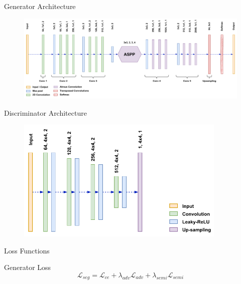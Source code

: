 \begin{frame}{Generator Architecture}
    \begin{figure}[!htb]
        \centering
        \includegraphics[width=14cm]{figures/method/generator_architecture}
    \end{figure}
\end{frame}


\begin{frame}{Discriminator Architecture}
    \begin{figure}[!htb]
        \centering
        \includegraphics[width=10cm]{figures/method/discriminator_architecture}
    \end{figure}
\end{frame}


\begin{frame}{Loss Functions}
    \begin{block}{Generator Loss}
        \begin{equation}
            \label{eq:seg_loss}
            \mathcal{L}_{seg} = \mathcal{L}_{ce} + \lambda_{adv}\mathcal{L}_{adv} + \lambda_{semi}\mathcal{L}_{semi}
        \end{equation}
    \end{block}
\end{frame}

